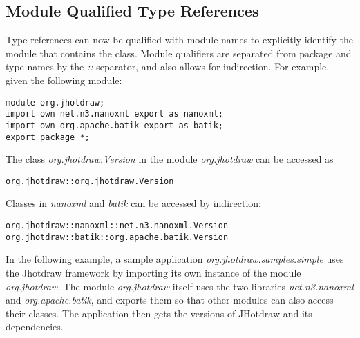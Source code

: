 
\subsection{Module Qualified Type References}

Type references can now be qualified with module names to explicitly
identify the module that contains the class. Module qualifiers
are separated from package and type names by the \textit{::} separator,
and also allows for indirection. For example, given the following module:

\begin{lstlisting}
module org.jhotdraw;
import own net.n3.nanoxml export as nanoxml;
import own org.apache.batik export as batik;
export package *;
\end{lstlisting}

The class \textit{org.jhotdraw.Version} in the module \textit{org.jhotdraw}
can be accessed as
\begin{lstlisting}
org.jhotdraw::org.jhotdraw.Version
\end{lstlisting}
Classes in \textit{nanoxml} and \textit{batik} can be accessed by indirection:
\begin{lstlisting}
org.jhotdraw::nanoxml::net.n3.nanoxml.Version
org.jhotdraw::batik::org.apache.batik.Version
\end{lstlisting}

In the following example, a sample application \textit{org.jhotdraw.samples.simple}
uses the Jhotdraw framework by importing its own instance of the module
\textit{org.jhotdraw}. The module \textit{org.jhotdraw} itself uses the 
two libraries \textit{net.n3.nanoxml} and \textit{org.apache.batik}, and
exports them so that other modules can also access their classes. The 
application then gets the versions of JHotdraw and its dependencies.

